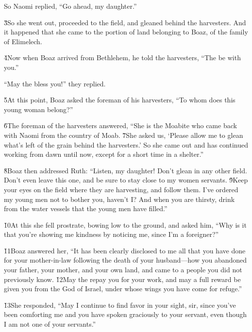 So Naomi replied, ``Go ahead, my daughter.''

\v{3}So she went out, proceeded to the field, and gleaned behind the harvesters. And it happened that she came to the portion of land belonging to Boaz, of the family of Elimelech.

\v{4}Now when Boaz arrived from Bethlehem, he told the harvesters, ``The  be with you.''

``May the  bless you!'' they replied.

\v{5}At this point, Boaz asked the foreman of his harvesters, ``To whom does this young woman belong?''

\v{6}The foreman of the harvesters answered, ``She is the Moabite who came back with Naomi from the country of Moab. \v{7}She asked us, `Please allow me to glean what's left of the grain behind the harvesters.' So she came out and has continued working from dawn until now, except for a short time in a shelter.''

\v{8}Boaz then addressed Ruth: ``Listen, my daughter! Don't glean in any other field. Don't even leave this one, and be sure to stay close to my women servants. \v{9}Keep your eyes on the field where they are harvesting, and follow them. I've ordered my young men not to bother you, haven't I? And when you are thirsty, drink from the water vessels that the young men have filled.''

\v{10}At this she fell prostrate, bowing low to the ground, and asked him, ``Why is it that you're showing me kindness by noticing me, since I'm a foreigner?''

\v{11}Boaz answered her, ``It has been clearly disclosed to me all that you have done for your mother-in-law following the death of your husband---how you abandoned your father, your mother, and your own land, and came to a people you did not previously know. \v{12}May the  repay you for your work, and may a full reward be given you from the  God of Israel, under whose wings you have come for refuge.''

\v{13}She responded, ``May I continue to find favor in your sight, sir, since you've been comforting me and you have spoken graciously to your servant, even though I am not one of your servants.''

